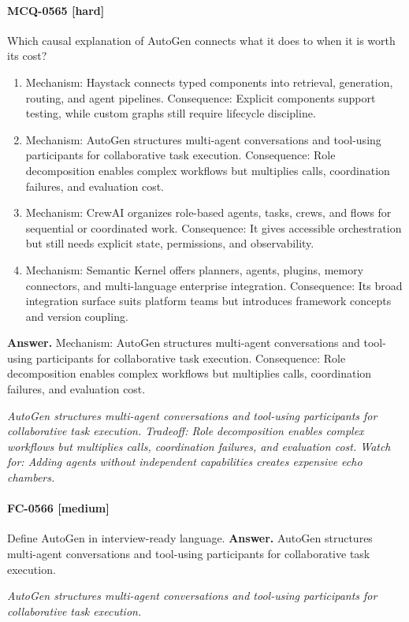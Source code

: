\paragraph{MCQ-0565 [hard]} Which causal explanation of AutoGen connects what it does to when it is worth its cost?
\begin{enumerate}[label=\Alph*.]
\item Mechanism: Haystack connects typed components into retrieval, generation, routing, and agent pipelines. Consequence: Explicit components support testing, while custom graphs still require lifecycle discipline.
\item Mechanism: AutoGen structures multi-agent conversations and tool-using participants for collaborative task execution. Consequence: Role decomposition enables complex workflows but multiplies calls, coordination failures, and evaluation cost.
\item Mechanism: CrewAI organizes role-based agents, tasks, crews, and flows for sequential or coordinated work. Consequence: It gives accessible orchestration but still needs explicit state, permissions, and observability.
\item Mechanism: Semantic Kernel offers planners, agents, plugins, memory connectors, and multi-language enterprise integration. Consequence: Its broad integration surface suits platform teams but introduces framework concepts and version coupling.
\end{enumerate}
\noindent\textbf{Answer.} Mechanism: AutoGen structures multi-agent conversations and tool-using participants for collaborative task execution. Consequence: Role decomposition enables complex workflows but multiplies calls, coordination failures, and evaluation cost.
\par\textit{AutoGen structures multi-agent conversations and tool-using participants for collaborative task execution. Tradeoff: Role decomposition enables complex workflows but multiplies calls, coordination failures, and evaluation cost. Watch for: Adding agents without independent capabilities creates expensive echo chambers.}
\paragraph{FC-0566 [medium]} Define AutoGen in interview-ready language.
\noindent\textbf{Answer.} AutoGen structures multi-agent conversations and tool-using participants for collaborative task execution.
\par\textit{AutoGen structures multi-agent conversations and tool-using participants for collaborative task execution.}
